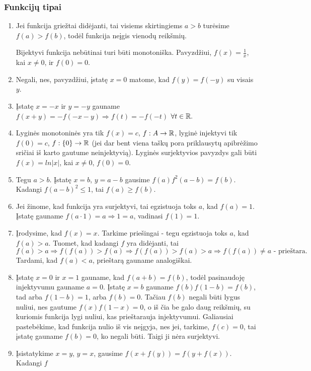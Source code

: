 \subsubsection*{Funkcijų tipai}
\begin{enumerate}
\item
    Jei funkcija griežtai didėjanti, tai visiems skirtingiems $a>b$
    turėsime $f(a)>f(b)$, todėl funkcija neįgis vienodų reikšmių. 
    
    Bijektyvi funkcija nebūtinai turi būti monotoniška. Pavyzdžiui,
    $f(x)=\frac{1}{x}$, kai $x\neq 0$, ir $f(0)=0$.
\item
    Negali, nes, pavyzdžiui, įstatę $x=0$ matome, kad $f(y)=f(-y)$ su visais $y$.
\item
    Įstatę $x=-x$ ir $y=-y$ gauname $f(x+y) = -f(-x-y)\Rightarrow
    f(t)=-f(-t)$ $\forall t \in \mathbb R.$
\item
    Lyginės monotoninės yra tik $f(x)=c$, $f:A\to \mathbb R$, lyginė injektyvi
    tik $f(0)=c$, $f:\{0\}\to \mathbb R$ (jei dar bent viena taškų pora
    priklausytų apibrėžimo sričiai iš karto gautume neinjektyvią). Lyginės
    surjektyvios pavyzdys gali būti $f(x)=ln|x|$, kai $x\neq 0$, $f(0)=0$.
\item
    Tegu $a>b$. Įstatę $x =b$, $y = a-b$ gausime $f(a)f^2(a-b)=f(b)$.
    Kadangi $f(a-b)^2\leq 1$, tai $f(a)\geq f(b)$.
\item
    Jei žinome, kad funkcija yra surjektyvi, tai egzistuoja toks $a$, kad
    $f(a)=1$. Įstatę gauname $f(a\cdot 1) =a \Rightarrow 1 = a$, vadinasi
    $f(1)=1$.
\item
    Įrodysime, kad $f(x)=x$. Tarkime priešingai - tegu egzistuoja toks
    $a$, kad $f(a)>a$. Tuomet, kad kadangi $f$ yra didėjanti, tai $$f(a)>a
    \Rightarrow f(f(a))>f(a) \Rightarrow f(f(a))>f(a)>a \Rightarrow
    f(f(a))\neq a \text { - prieštara}.$$ Tardami, kad $f(a)<a$, prieštarą
    gauname analogiškai.
\item
    Įstatę $x=0$ ir $x=1$ gauname, kad $f(a+b)=f(b)$, todėl pasinaudoję injektyvumu gauname $a = 0$.
    Įstatę $x=b$ gauname $f(b)f(1-b)=f(b)$, tad arba $f(1-b)=1$, arba
    $f(b)=0$. Tačiau $f(b)$ negali būti lygus nuliui, nes gautume
    $f(x)f(1-x)=0$, o iš čia be galo daug reikšmių, su kuriomis funkcija
    lygi nuliui, kas prieštarauja injektyvumui.
    Galiausiai pastebėkime, kad funkcija nulio iš vis neįgyja, nes jei,
    tarkime, $f(c)=0$, tai įstatę gauname $f(b)=0$, ko negali būti. Taigi
    ji nėra surjektyvi.
\item
    Įsistatykime $x=y$, $y=x$, gausime $f(x+f(y))=f(y+f(x))$. Kadangi $f$

\end{enumerate}
